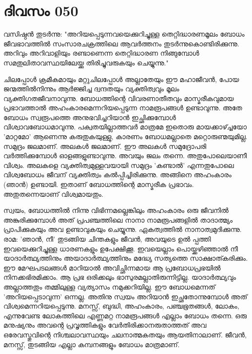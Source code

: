  
\section{ദിവസം 050}


വസിഷ്ഠന്‍ തുടര്‍ന്നു: "അറിയപ്പെടുന്നവയെക്കുറിച്ചുള്ള തെറ്റിദ്ധാരണമൂലം ബോധം ജീവഭാവത്തില്‍ സംസാരചക്രത്തിലെ ആവര്‍ത്തനം തുടര്‍ന്നുകൊണ്ടിരിക്കുന്നു. അറിവും അറിവാളിയും രണ്ടാണെന്ന തെറ്റിദ്ധാരണ നിങ്ങുമ്പോള്‍ സമതുലിതാവസ്ഥയിലേയ്ക്കു തിരിച്ചുവരുകയും ചെയ്യുന്നു."

ചിലപ്പോള്‍ ക്രമീകമായും മറ്റുചിലപ്പോള്‍ അല്ലാതേയും ഈ മഹാജീവന്‍, പോയ ജന്മത്തില്‍നിന്നും ആര്‍ജ്ജിച്ച ദ്വന്ദതയും വ്യക്തിത്വവും മൂലം വ്യക്തിഗതജീവനാവുന്നു. ബോധത്തിന്റെ വിവരണാതീതവും മാസ്മരീകവുമായ പ്രഭാവത്താല്‍ അഹംകാരമെന്നറിയപ്പെടുന്ന നാമരൂപങ്ങള്‍ ഉണ്ടാവുന്നു. അതേ ബോധം സ്വരൂപത്തെ അനുഭവിച്ചറിയാന്‍ ഇച്ഛിക്കുമ്പോള്‍ വിശ്വാവബോധമാവുന്നു. പക്വതയില്ലാത്തവര്‍ മാത്രമേ ഇതൊരു മായക്കാഴ്ച്ചയോ 'മാറ്റമോ' ആണെന്നു കരുതുകയുള്ളു, കാരണം ബോധമല്ലാതെ മറ്റൊരുണ്മയുമില്ല. സമുദ്രം ജലമാണ്‌. അലകള്‍ ജലമാണ്‌. ഈ അലകള്‍ സമുദ്രോപരി വര്‍ത്തിക്കുമ്പോള്‍ ഓളങ്ങളുണ്ടാവുന്നു. അവയും ജലം തന്നെ. അതുപോലെയാണീ വിശ്വം. അലകളെ വ്യക്തിത്വമുള്ളവയായി സമുദ്രം 'കണ്ടാല്‍' എന്നതുപോലെ വിശ്വബോധം ജീവന്‌ വ്യക്തിത്വം കല്‍പ്പിച്ചിരിക്കുന്നു. അങ്ങിനെ അഹംകാരം (ഞാന്‍) ഉണ്ടായി. ഇതാണ്‌ ബോധത്തിന്റെ മാസ്മരീക പ്രഭാവം. അതുതന്നെയാണ്‌ വിശ്വമായതും.

സ്വയം, ബോധത്തില്‍ നിന്നു വിഭിന്നമല്ലെങ്കിലും അഹംകാരം ഒരു ജീവനില്‍ അങ്കുരിക്കുമ്പോള്‍ അത്‌ പ്രപഞ്ചത്തിലെ നാനാ നാമരൂപങ്ങളില്‍ താദാത്മ്യം പ്രാപിക്കുകയും അവ ഉണ്ടാവുകയും ചെയ്യുന്നു. ഏകത്വത്തില്‍ നാനാത്വമുദിക്കുന്നു. രാമ: 'ഞാന്‍, നീ' തുടങ്ങിയ ചിന്തകളും ജീവന്‍, അവയുടെ ഉല്‍ പ്പത്തി ഇവയെക്കുറിച്ചുള്ള ധാരണകളും ഉപേക്ഷിക്കൂ. ഇവയെല്ലാം പൊയ്ക്കഴിഞ്ഞാല്‍ നീ യാദാര്‍ത്ഥ്യത്തിനും അയാദാര്‍ത്ഥ്യത്തിനും മദ്ധ്യേ സത്യത്തെ സാക്ഷാത്കരിക്കും. ഈ മേഘപടലങ്ങള്‍ മാറിയാല്‍ അവിച്ഛിന്നമായ ആ പ്രബോധപ്രഭയില്‍ നിനക്കഭിരമിക്കാം. ആ പ്രഭ ഒരിക്കലും ഭാസുരമല്ലാതിരുന്നിട്ടില്ല. യാദാര്‍ത്ഥ്യവും അല്ലാത്തതും തമ്മിലുള്ള വ്യത്യാസം നമുക്കറിയില്ല. ഈ ബോധമെന്നത്‌ 'അറിയപ്പെടാവുന്ന' ഒന്നല്ല. അതിനു സ്വയം അറിയാന്‍ ഇച്ഛതോന്നുമ്പോള്‍ അത്‌ വിശ്വമെന്നറിയപ്പെടുന്നു. മനസ്സ്‌, ബുദ്ധി, അഹംകാരം, പഞ്ചഭൂതങ്ങള്‍, ലോകം, എന്നുവേണ്ട ലോകത്തിലെ എണ്ണമറ്റ നാമരൂപങ്ങള്‍ എല്ലാം ബോധം തന്നെ. ഒരു മനുഷ്യനും അവന്റെ പ്രവൃത്തികളും വേര്‍തിരിക്കാനരുതാത്തത്‌ അവ ഒരേവസ്തുവിന്റെ നിശ്ചലാവസ്ഥയും ചലനാത്മകതയും ആയതിനാലാണ്‌. ജീവന്‍, മനസ്സ്‌, തുടങ്ങിയ എല്ലാ കമ്പനങ്ങളും ബോധം മാത്രമാണ്‌.

